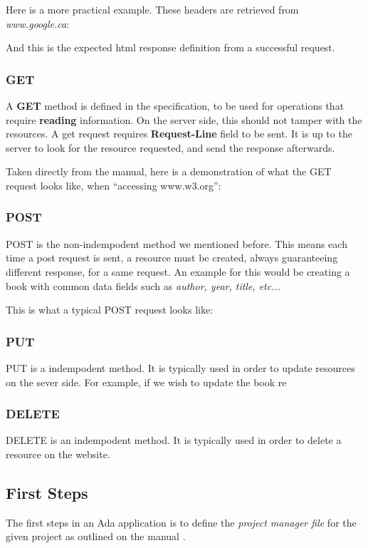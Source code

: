 Here is a more practical example. These headers are retrieved from \textit{www.google.ca}:


And this is the expected html response definition from a successful request.


\subsubsection{GET} 
A \textbf{GET} method is defined in the specification, to be used for operations that require \textbf{reading} information. On the server side, this should not tamper with the resources. 
A get request requires \textbf{Request-Line} field to be sent. It is up to the server to look for the resource requested, and send the response afterwards.

Taken directly from the manual, here is a demonstration of what the GET request looks like, when ``accessing www.w3.org'':


\subsubsection{POST}
POST is the non-indempodent method we mentioned before. This means each time a post request is sent, a resource must be created, always guaranteeing different response, for a same request. An example for this would be creating a book with common data fields such as \textit{author, year, title, etc...}

This is what a typical POST request looks like:

\subsubsection{PUT}
PUT is a indempodent method. It is typically used in order to update resources on the sever side. For example, if we wish to update the book re

\subsubsection{DELETE} 
DELETE is an indempodent method. It is typically used in order to delete a resource on the website.

\subsection{First Steps}
The first steps in an Ada application is to define the \textit{project manager  file} for the given project as outlined on the manual \cite{GNATintro}.

